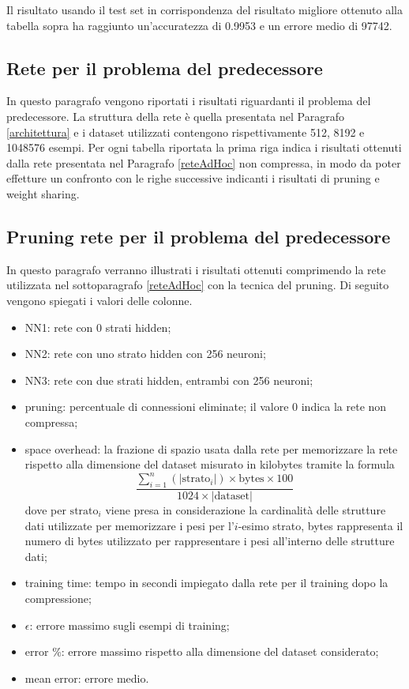\documentclass[12pt]{report}
\begin{document}
Il risultato usando il test set in corrispondenza del risultato migliore ottenuto alla tabella sopra ha raggiunto un'accuratezza di 0.9953 e un errore medio di 97742.

\newpage

\subsection{Rete per il problema del predecessore}
In questo paragrafo vengono riportati i risultati riguardanti il problema del predecessore.
La struttura della rete è quella presentata nel Paragrafo \ref{architettura} e i dataset utilizzati contengono rispettivamente 512, 8192 e 1048576 esempi.
Per ogni tabella riportata la prima riga indica i risultati ottenuti dalla rete presentata nel Paragrafo \ref{reteAdHoc} non compressa, in modo da poter effetture un confronto con le righe successive indicanti i risultati di pruning e weight sharing.

\subsection{Pruning rete per il problema del predecessore} \label{CSRProblem}
In questo paragrafo verranno illustrati i risultati ottenuti comprimendo la rete utilizzata nel sottoparagrafo \ref{reteAdHoc} con la tecnica del pruning.
Di seguito vengono spiegati i valori delle colonne.
\begin{itemize}
\item{NN1}: rete con 0 strati hidden;
\item{NN2}: rete con uno strato hidden con 256 neuroni;
\item{NN3}: rete con due strati hidden, entrambi con 256 neuroni;
\item{pruning}: percentuale di connessioni eliminate; il valore 0 indica la rete non compressa;
\item{space overhead}: la frazione di spazio usata dalla rete per memorizzare la rete rispetto alla dimensione del dataset misurato in kilobytes tramite la formula 
$$\displaystyle{\frac{\sum_{i=1}^n \left(|\mathrm{strato}_i|\right) \times \mathrm{bytes} \times 100}{1024 \times \left| \mathrm{dataset} \right|}}$$ dove per $\mathrm{strato}_i$ viene presa in considerazione la cardinalità delle strutture dati utilizzate per memorizzare i pesi per l'$i$-esimo strato, bytes rappresenta il numero di bytes utilizzato per rappresentare i pesi all'interno delle strutture dati;
\item{training time}: tempo in secondi impiegato dalla rete per il training dopo la compressione;
\item{$\epsilon$}: errore massimo sugli esempi di training;
\item{error \%}: errore massimo rispetto alla dimensione del dataset considerato;
\item{mean error}: errore medio.
\end{itemize}
\par\null\par
\par\null\par
\end{document}
